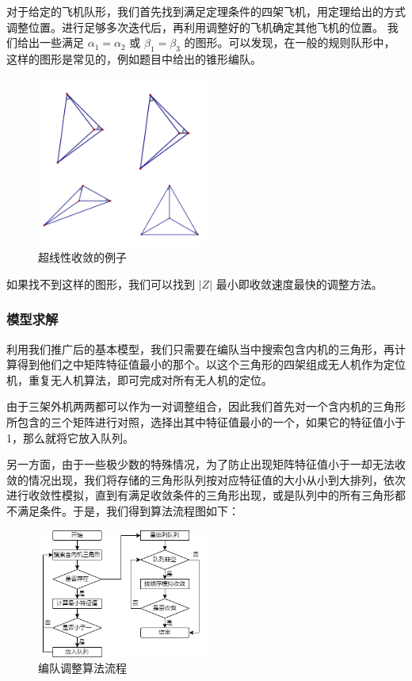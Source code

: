 \documentclass{my_paper}
\begin{document}
    对于给定的飞机队形，我们首先找到满足定理条件的四架飞机，用定理给出的方式调整位置。进行足够多次迭代后，再利用调整好的飞机确定其他飞机的位置。
    我们给出一些满足 $\alpha_1=\alpha_2$ 或 $\beta_1=\beta_3$ 的图形。可以发现，在一般的规则队形中，这样的图形是常见的，例如题目中给出的锥形编队。
\begin{figure}[H]
    \centering
    \includegraphics[width=0.5\textwidth]{four1}
    \caption{超线性收敛的例子} 
\end{figure}

    如果找不到这样的图形，我们可以找到 $|Z|$ 最小即收敛速度最快的调整方法。

\subsubsection{模型求解}
利用我们推广后的基本模型，我们只需要在编队当中搜索包含内机的三角形，再计算得到他们之中矩阵特征值最小的那个。以这个三角形的四架组成无人机作为定位机，重复无人机算法，即可完成对所有无人机的定位。

由于三架外机两两都可以作为一对调整组合，因此我们首先对一个含内机的三角形所包含的三个矩阵进行对照，选择出其中特征值最小的一个，如果它的特征值小于1，那么就将它放入队列。

另一方面，由于一些极少数的特殊情况，为了防止出现矩阵特征值小于一却无法收敛的情况出现，我们将存储的三角形队列按对应特征值的大小从小到大排列，依次进行收敛性模拟，直到有满足收敛条件的三角形出现，或是队列中的所有三角形都不满足条件。于是，我们得到算法流程图如下：

\begin{figure}[H]
    \centering
    \includegraphics[width=0.5\textwidth]{four2}
    \caption{编队调整算法流程} 
\end{figure}
\end{document}
